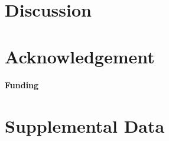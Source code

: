 \documentclass{frontiersSCNS} %
\begin{document}
\section{Discussion}


\section*{Acknowledgement}


\paragraph{Funding\textcolon}

\section*{Supplemental Data}



\end{document}
